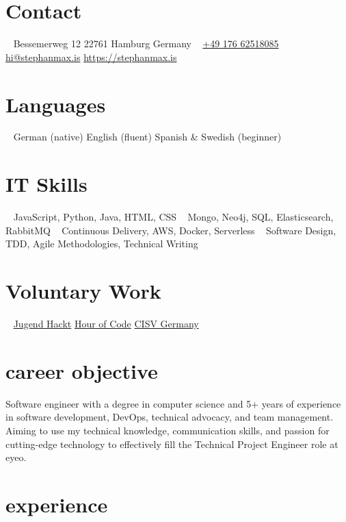 \documentclass[a4paper]{cv}
\begin{document}

  \begin{aside}
    \section{Contact}
      ~
      Bessemerweg 12
      22761 Hamburg
      Germany
      ~
      \href{tel:+4917662518085}{+49 176 62518085}
      \href{mailto:hi@stephanmax.is}{hi@stephanmax.is}
      \href{https://stephanmax.is}{https://stephanmax.is}
    \section{Languages}
      ~
      German (native)
      English (fluent)
      Spanish \& Swedish (beginner)
    \section{IT Skills}
      ~
      JavaScript, Python, Java, HTML, CSS
      ~
      Mongo, Neo4j, SQL, Elasticsearch, RabbitMQ
      ~
      Continuous Delivery, AWS, Docker, Serverless
      ~
      Software Design, TDD, Agile Methodologies, Technical Writing
    \section{Voluntary Work}
      ~
      \href{https://jugendhackt.org/}{Jugend Hackt}
      \href{https://hourofcode.com/de}{Hour of Code}
      \href{http://de.cisv.org/}{CISV Germany}
  \end{aside}

  \section{career objective}

  Software engineer with a degree in computer science and 5+ years of experience in software development, DevOps, technical advocacy, and team management. Aiming to use my technical knowledge, communication skills, and passion for cutting-edge technology to effectively fill the Technical Project Engineer role at eyeo.

  \section{experience}
\end{document}
